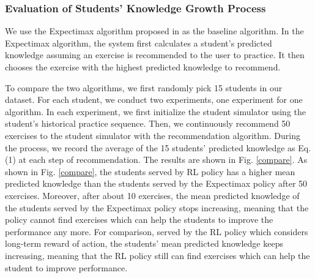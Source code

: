 \documentclass{edm_template}
\begin{document}


\subsubsection{Evaluation of Students' Knowledge Growth Process}

We use the Expectimax algorithm proposed in \cite{dkt} as the baseline algorithm. In the Expectimax algorithm, the system first calculates a student's predicted knowledge assuming an exercise is recommended to the user to practice. It then chooses the exercise with the highest predicted knowledge to recommend.

To compare the two algorithms, we first randomly pick 15 students in our dataset. For each student, we conduct two experiments, one experiment for one algorithm. In each experiment, we first initialize the student simulator using the student's historical practice sequence. Then, we continuously recommend 50 exercises to the student simulator with the recommendation algorithm. During the process, we record the average of the 15 students' predicted knowledge as Eq.(1) at each step of recommendation. The results are shown in Fig. \ref{compare}. As shown in Fig. \ref{compare}, the students served by RL policy has a higher mean predicted knowledge than the students served by the Expectimax policy after 50 exercises. Moreover, after about 10 exercises, the mean predicted knowledge of the students served by the Expectimax policy stops increasing, meaning that the policy cannot find exercises which can help the students to improve the performance any more. For comparison, served by the RL policy which considers long-term reward of action, the students' mean predicted knowledge keeps increasing, meaning that the RL policy still can find exercises which can help the student to improve performance.

\end{document}
